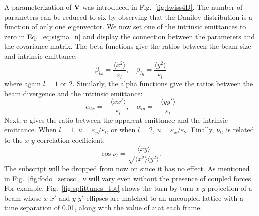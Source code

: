 A parameterization of $\mathbf{V}$ was introduced in Fig.~\ref{fig:twiss4D}. The number of parameters can be reduced to six by observing that the Danilov distribution is a function of only one eigenvector. We now set one of the intrinsic emittances to zero in Eq.~\eqref{eq:sigma_n} and display the connection between the parameters and the covariance matrix. The beta functions give the ratios between the beam size and intrinsic emittance:
%
\begin{equation}
    \beta_{lx} = \frac{\langle{x^2}\rangle}{\varepsilon_l}, \quad
    \beta_{ly} = \frac{\langle{y^2}\rangle}{\varepsilon_l}
\end{equation}
%
where again $l = 1$ or $2$. Similarly, the alpha functions give the ratios between the beam divergence and the intrinsic emittance:
%
\begin{equation}
    \alpha_{lx} = -\frac{\langle{xx'}\rangle}{\varepsilon_l}, \quad
    \alpha_{ly} = -\frac{\langle{yy'}\rangle}{\varepsilon_l}
\end{equation}
%
Next, $u$ gives the ratio between the apparent emittance and the intrinsic emittance. When $l = 1$, $u = \varepsilon_y / \varepsilon_l$, or when $l = 2$, $u = \varepsilon_x / \varepsilon_2$.
Finally, $\nu_l$, is related to the $x$-$y$ correlation coefficient:
%
\begin{equation}
    \cos\nu_l = \frac{\langle{xy}\rangle}{\sqrt{\langle{x^2}\rangle\langle{y^2}\rangle}}.
\end{equation}
%
The subscript will be dropped from now on since it has no effect. As mentioned in Fig.~\ref{fig:fodo_zerosc}, $\nu$ will vary even without the presence of coupled forces. For example, Fig.~\ref{fig:splittunes_tbt} shows the turn-by-turn $x$-$y$ projection of a beam whose $x$-$x'$ and $y$-$y'$ ellipses are matched to an uncoupled lattice with a tune separation of 0.01, along with the value of $\nu$ at each frame. 
%
